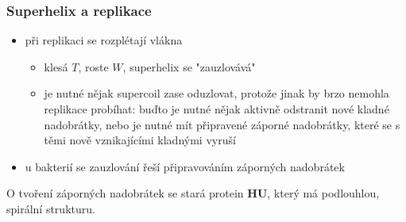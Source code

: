 \documentclass[DIV=8]{scrreprt}
\begin{document}
\subsubsection{Superhelix a replikace} \label{Superhelix a replikace}


\begin{itemize}[nosep]
    \item při replikaci se rozplétají vlákna
\begin{itemize}[nosep]
    \item klesá \(T\), roste \(W\), superhelix se "zauzlovává"
    \item je nutné nějak supercoil zase oduzlovat, protože jinak by brzo nemohla replikace probíhat: buďto je nutné nějak aktivně odstranit nové kladné nadobrátky, nebo je nutné mít připravené záporné nadobrátky, které se s těmi nově vznikajícími kladnými vyruší
\end{itemize}

    \item u bakterií se zauzlování řeší připravováním záporných nadobrátek
\end{itemize}



O tvoření záporných nadobrátek se stará protein \textbf{HU}, který má podlouhlou, spirální strukturu.
\end{document}
